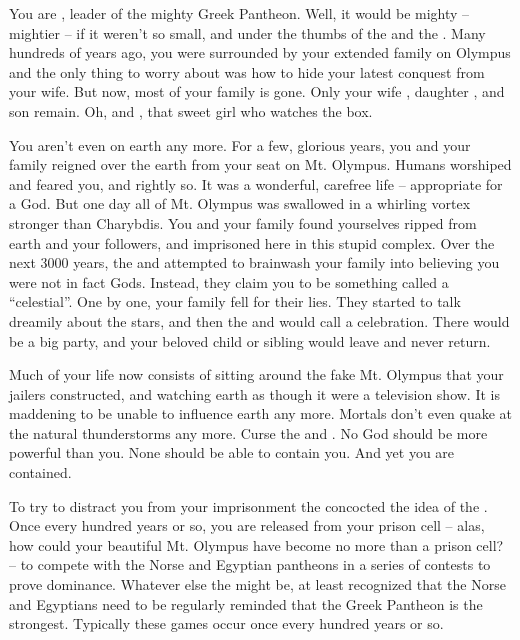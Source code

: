 \documentclass[char]{guardians}
\begin{document}
\name{\cZeus{}}

You are \cZeus{}, leader of the mighty Greek Pantheon. Well, it would be mighty -- mightier -- if it weren't so small, and under the thumbs of the \cWarden{} and the \cCaretaker{}.  Many hundreds of years ago, you were surrounded by your extended family on Olympus and the only thing to worry about was how to hide your latest conquest from your wife. But now, most of your family is gone. Only your wife \cHera{}, daughter \cAthena{}, and son \cHephaestus{} remain. Oh, and \cPandora{}, that sweet girl who watches the box.

You aren't even on earth any more. For a few, glorious years, you and your family reigned over the earth from your seat on Mt. Olympus. Humans worshiped and feared you, and rightly so. It was a wonderful, carefree life -- appropriate for a God.  But one day all of Mt. Olympus was swallowed in a whirling vortex stronger than Charybdis. You and your family found yourselves ripped from earth and your followers, and imprisoned here in this stupid complex. Over the next 3000 years, the \cWarden{} and \cCaretaker{} attempted to brainwash your family into believing you were not in fact Gods. Instead, they claim you to be something called a ``celestial''. One by one, your family fell for their lies. They started to talk dreamily about the stars, and then the \cWarden{} and \cCaretaker{} would call a celebration. There would be a big party, and your beloved child or sibling would leave and never return.

Much of your life now consists of sitting around the fake Mt. Olympus that your jailers constructed, and watching earth as though it were a television show. It is maddening to be unable to influence earth any more. Mortals don't even quake at the natural thunderstorms any more. Curse the \cWarden{} and \cCaretaker{}. No God should be more powerful than you. None should be able to contain you. And yet you are contained.

To try to distract you from your imprisonment the \cCaretaker{} concocted the idea of the \pGames{}. Once every hundred years or so, you are released from your prison cell -- alas, how could your beautiful Mt. Olympus have become no more than a prison cell? -- to compete with the Norse and Egyptian pantheons in a series of contests to prove dominance. Whatever else the \cCaretaker{} might be, at least \cCaretaker{\they} recognized that the Norse and Egyptians need to be regularly reminded that the Greek Pantheon is the strongest. Typically these games occur once every hundred years or so.
\end{document}
